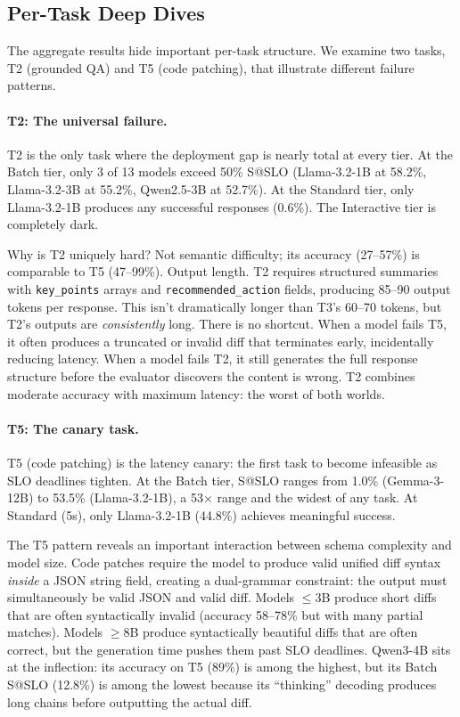 \documentclass[11pt]{article}
\begin{document}
\subsection{Per-Task Deep Dives}

The aggregate results hide important per-task structure.  We examine two tasks, T2 (grounded QA) and T5 (code patching), that illustrate different failure patterns.

\paragraph{T2: The universal failure.}
T2 is the only task where the deployment gap is nearly total at every tier.  At the Batch tier, only 3 of 13 models exceed 50\% S@SLO (Llama-3.2-1B at 58.2\%, Llama-3.2-3B at 55.2\%, Qwen2.5-3B at 52.7\%).  At the Standard tier, only Llama-3.2-1B produces any successful responses (0.6\%).  The Interactive tier is completely dark.

Why is T2 uniquely hard?  Not semantic difficulty; its accuracy (27--57\%) is comparable to T5 (47--99\%).  Output length.  T2 requires structured summaries with \texttt{key\_points} arrays and \texttt{recommended\_action} fields, producing 85--90 output tokens per response.  This isn't dramatically longer than T3's 60--70 tokens, but T2's outputs are \emph{consistently} long.  There is no shortcut.  When a model fails T5, it often produces a truncated or invalid diff that terminates early, incidentally reducing latency.  When a model fails T2, it still generates the full response structure before the evaluator discovers the content is wrong.  T2 combines moderate accuracy with maximum latency: the worst of both worlds.

\paragraph{T5: The canary task.}
T5 (code patching) is the latency canary: the first task to become infeasible as SLO deadlines tighten.  At the Batch tier, S@SLO ranges from 1.0\% (Gemma-3-12B) to 53.5\% (Llama-3.2-1B), a 53$\times$ range and the widest of any task.  At Standard (5s), only Llama-3.2-1B (44.8\%) achieves meaningful success.

The T5 pattern reveals an important interaction between schema complexity and model size.  Code patches require the model to produce valid unified diff syntax \emph{inside} a JSON string field, creating a dual-grammar constraint: the output must simultaneously be valid JSON and valid diff.  Models $\leq$3B produce short diffs that are often syntactically invalid (accuracy 58--78\% but with many partial matches).  Models $\geq$8B produce syntactically beautiful diffs that are often correct, but the generation time pushes them past SLO deadlines.  Qwen3-4B sits at the inflection: its accuracy on T5 (89\%) is among the highest, but its Batch S@SLO (12.8\%) is among the lowest because its ``thinking'' decoding produces long chains before outputting the actual diff.
\end{document}
